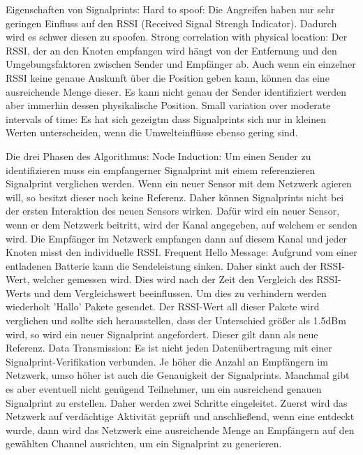 \documentclass[12pt,a4paper]{article}
\begin{document}
Eigenschaften von Signalprints:
	Hard to spoof: 
		Die Angreifen haben nur sehr geringen Einfluss auf den RSSI (Received Signal Strengh Indicator). Dadurch wird es schwer diesen zu spoofen. 
	Strong correlation with physical location:
		Der RSSI, der an den Knoten empfangen wird hängt von der Entfernung und den Umgebungsfaktoren zwischen Sender und Empfänger ab. Auch wenn ein einzelner RSSI keine genaue Auskunft über die Position geben kann, können das eine ausreichende Menge dieser. Es kann nicht genau der Sender identifiziert werden aber immerhin dessen physikalische Position.
	Small variation over moderate intervals of time:
		Es hat sich gezeigtm dass Signalprints sich nur in kleinen Werten unterscheiden, wenn die Umwelteinflüsse ebenso gering sind.

Die drei Phasen des Algorithmus:
	Node Induction: 
		Um einen Sender zu identifizieren muss ein empfangerner Signalprint mit einem referenzieren Signalprint verglichen werden. Wenn ein neuer Sensor mit dem Netzwerk agieren will, so besitzt dieser noch keine Referenz.  Daher können Signalprints nicht bei der ersten Interaktion des neuen Sensors wirken. Dafür wird ein neuer Sensor, wenn er dem Netzwerk beitritt, wird der Kanal angegeben, auf welchem er senden wird. Die Empfänger im Netzwerk empfangen dann auf diesem Kanal und jeder Knoten misst den individuelle RSSI. 
	Frequent Hello Message:
		Aufgrund vom einer entladenen Batterie kann die Sendeleistung sinken. Daher sinkt auch der RSSI-Wert, welcher gemessen wird. Dies wird nach der Zeit den Vergleich des RSSI-Werts und dem Vergleichswert beeinflussen. Um dies zu verhindern werden wiederholt 'Hallo' Pakete gesendet. Der RSSI-Wert all dieser Pakete wird verglichen und sollte sich herausstellen, dass der Unterschied größer als 1.5dBm wird, so wird ein neuer Signalprint angefordert. Dieser gilt dann als neue Referenz.
	Data Transmission:
		Es ist nicht jeden Datenübertragung mit einer Signalprint-Verifikation verbunden. Je höher die Anzahl an Empfängern im Netzwerk, umso höher ist auch die Genauigkeit der Signalprints. Manchmal gibt es aber eventuell nicht genügend Teilnehmer, um ein ausreichend genauen Signalprint zu erstellen. Daher werden zwei Schritte eingeleitet. Zuerst wird das Netzwerk auf verdächtige Aktivität geprüft und anschließend, wenn eine entdeckt wurde, dann wird das Netzwerk eine ausreichende Menge an Empfängern auf den gewählten Channel ausrichten, um ein Signalprint zu generieren.
\end{document}
